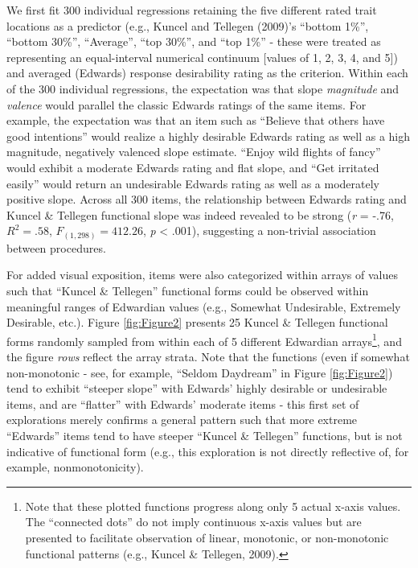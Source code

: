 \documentclass[
  ,jou]{apa6}
\begin{document}
We first fit 300 individual regressions retaining the five different rated trait locations as a predictor (e.g., Kuncel and Tellegen (2009)'s ``bottom 1\%'', ``bottom 30\%'', ``Average'', ``top 30\%'', and ``top 1\%'' - these were treated as representing an equal-interval numerical continuum {[}values of 1, 2, 3, 4, and 5{]}) and averaged (Edwards) response desirability rating as the criterion. Within each of the 300 individual regressions, the expectation was that slope \emph{magnitude} and \emph{valence} would parallel the classic Edwards ratings of the same items. For example, the expectation was that an item such as ``Believe that others have good intentions'' would realize a highly desirable Edwards rating as well as a high magnitude, negatively valenced slope estimate. ``Enjoy wild flights of fancy'' would exhibit a moderate Edwards rating and flat slope, and ``Get irritated easily'' would return an undesirable Edwards rating as well as a moderately positive slope. Across all 300 items, the relationship between Edwards rating and Kuncel \& Tellegen functional slope was indeed revealed to be strong (\emph{r} = -.76, \(R^2 = .58\), \(F_{(1,298)} = 412.26\), \emph{p} \textless{} .001), suggesting a non-trivial association between procedures.

For added visual exposition, items were also categorized within arrays of values such that ``Kuncel \& Tellegen'' functional forms could be observed within meaningful ranges of Edwardian values (e.g., Somewhat Undesirable, Extremely Desirable, etc.). Figure \ref{fig:Figure2} presents 25 Kuncel \& Tellegen functional forms randomly sampled from within each of 5 different Edwardian arrays\footnote{Note that these plotted functions progress along only 5 actual x-axis values. The ``connected dots'' do not imply continuous x-axis values but are presented to facilitate observation of linear, monotonic, or non-monotonic functional patterns (e.g., Kuncel \& Tellegen, 2009).}, and the figure \emph{rows} reflect the array strata. Note that the functions (even if somewhat non-monotonic - see, for example, ``Seldom Daydream'' in Figure \ref{fig:Figure2}) tend to exhibit ``steeper slope'' with Edwards' highly desirable or undesirable items, and are ``flatter'' with Edwards' moderate items - this first set of explorations merely confirms a general pattern such that more extreme ``Edwards'' items tend to have steeper ``Kuncel \& Tellegen'' functions, but is not indicative of functional form (e.g., this exploration is not directly reflective of, for example, nonmonotonicity).
\end{document}
